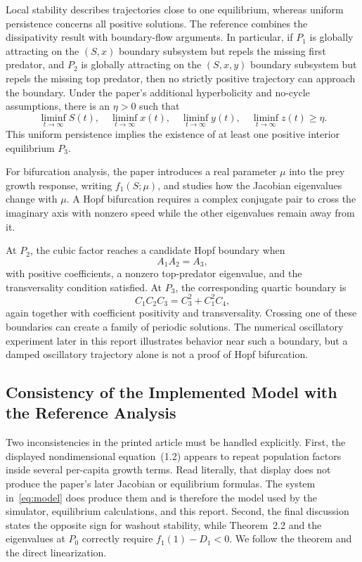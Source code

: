 Local stability describes trajectories close to one equilibrium, whereas
uniform persistence concerns all positive solutions.  The reference combines
the dissipativity result with boundary-flow arguments.  In particular, if
\(P_1\) is globally attracting on the \((S,x)\) boundary subsystem but repels
the missing first predator, and \(P_2\) is globally attracting on the
\((S,x,y)\) boundary subsystem but repels the missing top predator, then no
strictly positive trajectory can approach the boundary.  Under the paper's
additional hyperbolicity and no-cycle assumptions, there is an \(\eta>0\)
such that
\begin{equation}
\liminf_{t\to\infty}S(t),\quad
\liminf_{t\to\infty}x(t),\quad
\liminf_{t\to\infty}y(t),\quad
\liminf_{t\to\infty}z(t)\geq\eta.
\end{equation}
This uniform persistence implies the existence of at least one positive
interior equilibrium \(P_3\).

For bifurcation analysis, the paper introduces a real parameter \(\mu\) into
the prey growth response, writing \(f_1(S;\mu)\), and studies how the Jacobian
eigenvalues change with \(\mu\).  A Hopf bifurcation requires a complex
conjugate pair to cross the imaginary axis with nonzero speed while the other
eigenvalues remain away from it.

At \(P_2\), the cubic factor reaches a candidate Hopf boundary when
\begin{equation}
\label{eq:p2-hopf-boundary}
A_1A_2=A_3,
\end{equation}
with positive coefficients, a nonzero top-predator eigenvalue, and the
transversality condition satisfied.  At \(P_3\), the corresponding quartic
boundary is
\begin{equation}
\label{eq:p3-hopf-boundary}
C_1C_2C_3=C_3^2+C_1^2C_4,
\end{equation}
again together with coefficient positivity and transversality.  Crossing one
of these boundaries can create a family of periodic solutions.  The numerical
oscillatory experiment later in this report illustrates behavior near such a
boundary, but a damped oscillatory trajectory alone is not a proof of Hopf
bifurcation.

\subsection{Consistency of the Implemented Model with the Reference Analysis}

Two inconsistencies in the printed article must be handled explicitly.  First,
the displayed nondimensional equation~(1.2) appears to repeat population
factors inside several per-capita growth terms.  Read literally, that display
does not produce the paper's later Jacobian or equilibrium formulas.  The
system in~\eqref{eq:model} does produce them and is therefore the model used by
the simulator, equilibrium calculations, and this report.  Second, the final
discussion states the opposite sign for washout stability, while Theorem~2.2
and the eigenvalues at \(P_0\) correctly require
\(f_1(1)-D_1<0\).  We follow the theorem and the direct linearization.

